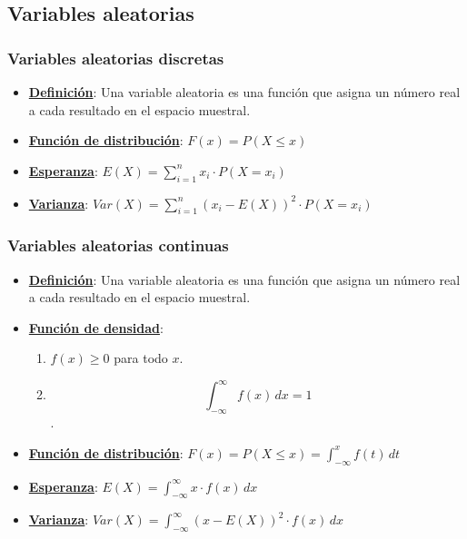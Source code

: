 \subsection{Variables aleatorias}
\subsubsection{Variables aleatorias discretas}
\begin{itemize}
    \item \hyperref[sec:variableAleatoria]{\textbf{Definición}}: Una variable aleatoria es una función que asigna un número real a cada resultado en el espacio muestral.

    \item \hyperref[sec:funcionDistribucion]{\textbf{Función de distribución}}: $F(x) = P(X \leq x)$

    \item \hyperref[sec:esperanza]{\textbf{Esperanza}}: $E(X) = \sum_{i=1}^{n} x_i \cdot P(X = x_i)$
    \item \hyperref[sec:varianza]{\textbf{Varianza}}: $Var(X) = \sum_{i=1}^{n} (x_i - E(X))^2 \cdot P(X = x_i)$ 
\end{itemize}

\subsubsection{Variables aleatorias continuas}
\begin{itemize}
    \item \hyperref[sec:variableAleatoria]{\textbf{Definición}}: Una variable aleatoria es una función que asigna un número real a cada resultado en el espacio muestral.

    \item \hyperref[sec:funcionDensidad]{\textbf{Función de densidad}}:
    \begin{enumerate}
      \item $f(x) \geq 0$ para todo $x$. 
      \item $$\int_{-\infty}^{\infty} f(x) \, dx = 1$$. 
    \end{enumerate}

    \item \hyperref[sec:funcionDistribucion]{\textbf{Función de distribución}}: $F(x) = P(X \leq x) = \int_{-\infty}^{x} f(t) \, dt$

    \item \hyperref[sec:esperanza]{\textbf{Esperanza}}: $E(X) = \int_{-\infty}^{\infty} x \cdot f(x) \, dx$
    \item \hyperref[sec:varianza]{\textbf{Varianza}}: $Var(X) = \int_{-\infty}^{\infty} (x - E(X))^2 \cdot f(x) \, dx$
\end{itemize}

